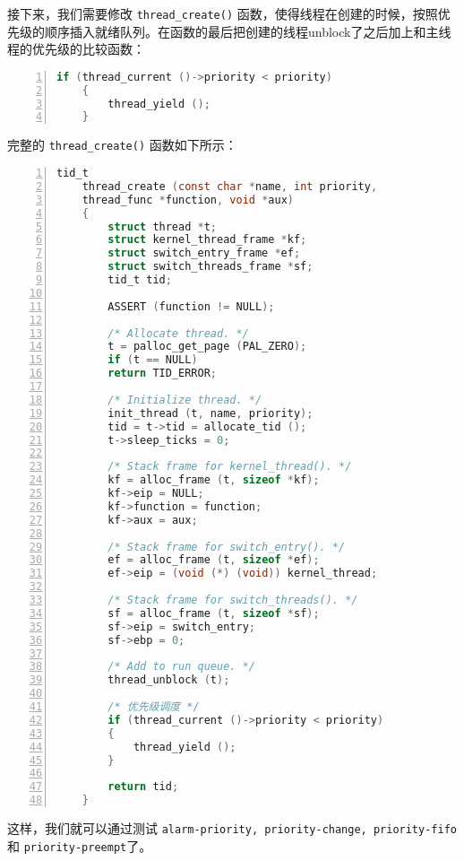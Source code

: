 \documentclass{article}
\begin{document}
	接下来，我们需要修改 \texttt{thread\_create()} 函数，使得线程在创建的时候，按照优先级的顺序插入就绪队列。在函数的最后把创建的线程unblock了之后加上和主线程的优先级的比较函数：
	
	\begin{lstlisting}[xleftmargin = 4em,xrightmargin = 4em, aboveskip = 1em, numbers = left, language = C, title=\texttt{thread\_create}函数结尾补充：]
    if (thread_current ()->priority < priority)
    {
        thread_yield ();
    }
	\end{lstlisting}
	
	完整的 \texttt{thread\_create()} 函数如下所示：
	
	\begin{lstlisting}[xleftmargin = 4em,xrightmargin = 3em, aboveskip = 1em, numbers = left, language = C, title=修改后的\texttt{thread\_create()}函数]
    tid_t
    thread_create (const char *name, int priority,
    thread_func *function, void *aux) 
    {
    	struct thread *t;
    	struct kernel_thread_frame *kf;
    	struct switch_entry_frame *ef;
    	struct switch_threads_frame *sf;
    	tid_t tid;
    	
    	ASSERT (function != NULL);
    	
    	/* Allocate thread. */
    	t = palloc_get_page (PAL_ZERO);
    	if (t == NULL)
    	return TID_ERROR;
    	
    	/* Initialize thread. */
    	init_thread (t, name, priority);
    	tid = t->tid = allocate_tid ();
    	t->sleep_ticks = 0;
    	
    	/* Stack frame for kernel_thread(). */
    	kf = alloc_frame (t, sizeof *kf);
    	kf->eip = NULL;
    	kf->function = function;
    	kf->aux = aux;
    	
    	/* Stack frame for switch_entry(). */
    	ef = alloc_frame (t, sizeof *ef);
    	ef->eip = (void (*) (void)) kernel_thread;
    	
    	/* Stack frame for switch_threads(). */
    	sf = alloc_frame (t, sizeof *sf);
    	sf->eip = switch_entry;
    	sf->ebp = 0;
    	
    	/* Add to run queue. */
    	thread_unblock (t);
    	
    	/* 优先级调度 */
    	if (thread_current ()->priority < priority)
    	{
    		thread_yield ();
    	}
    	
    	return tid;
    }
	\end{lstlisting}
	
	这样，我们就可以通过测试 \texttt{alarm-priority, priority-change, priority-fifo} 和 \texttt{priority-preempt}了。
	
\end{document}

